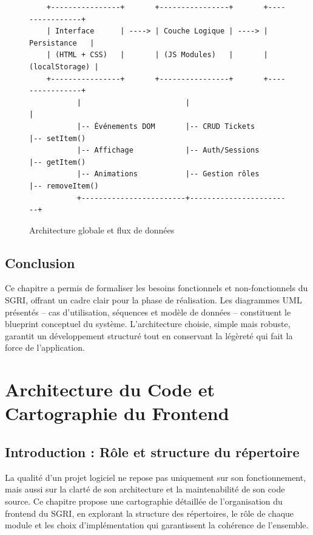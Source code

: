 \documentclass[12pt,a4paper,twoside]{report}
\begin{document}
\begin{figure}[H]
    \centering
    \caption{Architecture globale et flux de données}
    \label{fig:architecture}
    \begin{verbatim}
    +----------------+       +----------------+       +----------------+
    | Interface      | ----> | Couche Logique | ----> |  Persistance   |
    | (HTML + CSS)   |       | (JS Modules)   |       | (localStorage) |
    +----------------+       +----------------+       +----------------+
           |                        |                        |
           |-- Événements DOM       |-- CRUD Tickets         |-- setItem()
           |-- Affichage            |-- Auth/Sessions        |-- getItem()
           |-- Animations           |-- Gestion rôles        |-- removeItem()
           +------------------------+------------------------+
    \end{verbatim}
\end{figure}

\section{Conclusion}

Ce chapitre a permis de formaliser les besoins fonctionnels et non-fonctionnels du SGRI, offrant un cadre clair pour la phase de réalisation. Les diagrammes UML présentés -- cas d'utilisation, séquences et modèle de données -- constituent le blueprint conceptuel du système. L'architecture choisie, simple mais robuste, garantit un développement structuré tout en conservant la légèreté qui fait la force de l'application.

\chapter{Architecture du Code et Cartographie du Frontend}

\section{Introduction : Rôle et structure du répertoire}

La qualité d'un projet logiciel ne repose pas uniquement sur son fonctionnement, mais aussi sur la clarté de son architecture et la maintenabilité de son code source. Ce chapitre propose une cartographie détaillée de l'organisation du frontend du SGRI, en explorant la structure des répertoires, le rôle de chaque module et les choix d'implémentation qui garantissent la cohérence de l'ensemble.
\end{document}
